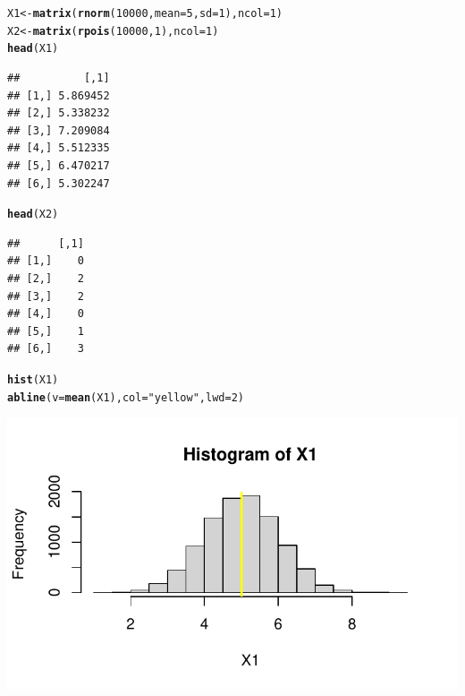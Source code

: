 \documentclass{article}\usepackage[]{graphicx}\usepackage[]{color}
\makeatletter
\def\maxwidth{ %
  \ifdim\Gin@nat@width>\linewidth
    \linewidth
  \else
    \Gin@nat@width
  \fi
}
\newcommand{\hlnum}[1]{\textcolor[rgb]{0.686,0.059,0.569}{#1}}%
\newcommand{\hlstr}[1]{\textcolor[rgb]{0.192,0.494,0.8}{#1}}%
\newcommand{\hlstd}[1]{\textcolor[rgb]{0.345,0.345,0.345}{#1}}%
\newcommand{\hlkwb}[1]{\textcolor[rgb]{0.69,0.353,0.396}{#1}}%
\newcommand{\hlkwc}[1]{\textcolor[rgb]{0.333,0.667,0.333}{#1}}%
\newcommand{\hlkwd}[1]{\textcolor[rgb]{0.737,0.353,0.396}{\textbf{#1}}}%
\newenvironment{kframe}{%
 \def\at@end@of@kframe{}%
 \ifinner\ifhmode%
  \def\at@end@of@kframe{\end{minipage}}%
  \begin{minipage}{\columnwidth}%
 \fi\fi%
 \def\FrameCommand##1{\hskip\@totalleftmargin \hskip-\fboxsep
 \colorbox{shadecolor}{##1}\hskip-\fboxsep
     \hskip-\linewidth \hskip-\@totalleftmargin \hskip\columnwidth}%
 \MakeFramed {\advance\hsize-\width
   \@totalleftmargin\z@ \linewidth\hsize
   \@setminipage}}%
 {\par\unskip\endMakeFramed%
 \at@end@of@kframe}
\newenvironment{knitrout}{}{} %
\makeatother
\begin{document}
\vspace*{0.5cm}
\begin{knitrout}
\color{fgcolor}\begin{kframe}
\begin{alltt}
\hlstd{X1} \hlkwb{<-} \hlkwd{matrix}\hlstd{(}\hlkwd{rnorm}\hlstd{(}\hlnum{10000}\hlstd{,} \hlkwc{mean} \hlstd{=} \hlnum{5}\hlstd{,} \hlkwc{sd} \hlstd{=} \hlnum{1}\hlstd{),}\hlkwc{ncol} \hlstd{=} \hlnum{1}\hlstd{)}
\hlstd{X2} \hlkwb{<-} \hlkwd{matrix}\hlstd{(}\hlkwd{rpois}\hlstd{(}\hlnum{10000}\hlstd{,} \hlnum{1}\hlstd{),}\hlkwc{ncol} \hlstd{=} \hlnum{1}\hlstd{)}
\hlkwd{head}\hlstd{(X1)}
\end{alltt}
\begin{verbatim}
##          [,1]
## [1,] 5.869452
## [2,] 5.338232
## [3,] 7.209084
## [4,] 5.512335
## [5,] 6.470217
## [6,] 5.302247
\end{verbatim}
\begin{alltt}
\hlkwd{head}\hlstd{(X2)}
\end{alltt}
\begin{verbatim}
##      [,1]
## [1,]    0
## [2,]    2
## [3,]    2
## [4,]    0
## [5,]    1
## [6,]    3
\end{verbatim}
\end{kframe}
\end{knitrout}

\begin{knitrout}
\color{fgcolor}\begin{kframe}
\begin{alltt}
\hlkwd{hist}\hlstd{(X1)}
\hlkwd{abline}\hlstd{(}\hlkwc{v} \hlstd{=} \hlkwd{mean}\hlstd{(X1),} \hlkwc{col} \hlstd{=} \hlstr{"yellow"}\hlstd{,} \hlkwc{lwd} \hlstd{=} \hlnum{2}\hlstd{)}
\end{alltt}
\end{kframe}
\includegraphics[width=\maxwidth]{figure/unnamed-chunk-7-1} 
\end{knitrout}
\end{document}
